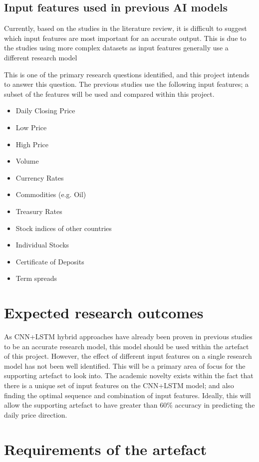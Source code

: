 \subsection{Input features used in previous AI models}
Currently, based on the studies in the literature review, it is difficult to suggest which input features
are most important for an accurate output. This is due to the studies using more complex datasets as input
features generally use a different research model 

This is one of the primary research questions identified, and this project intends to answer this question.
The previous studies use the following input features; a subset of the features will be used and compared
within this project. 
\begin{itemize}
    \item Daily Closing Price
    \item Low Price
    \item High Price
    \item Volume
    \item Currency Rates
    \item Commodities (e.g. Oil)
    \item Treasury Rates
    \item Stock indices of other countries
    \item Individual Stocks
    \item Certificate of Deposits
    \item Term spreads
\end{itemize}

\section{Expected research outcomes}
As CNN+LSTM hybrid approaches have already been proven in previous studies to be an accurate research model,
this model should be used within the artefact of this project. However, the effect of different input
features on a single research model has not been well identified. This will be a primary area of focus for
the supporting artefact to look into. The academic novelty exists within the fact that
there is a unique set of input features on the CNN+LSTM model; and also finding the optimal sequence and
combination of input features. Ideally, this will allow the supporting artefact to have greater than
60\% accuracy in predicting the daily price direction.

\section{Requirements of the artefact}
